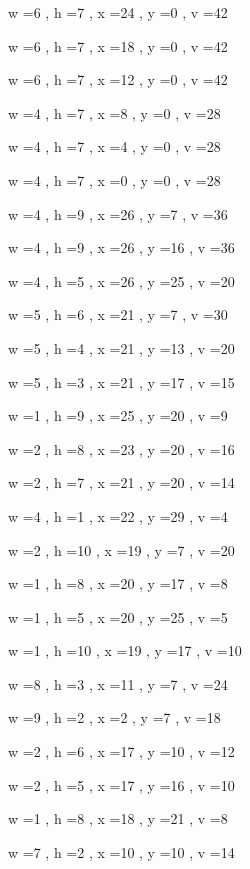 \documentclass[11pt]{article}
\begin{document}


w =6 , h =7 , x =24 , y =0 , v =42
\par
w =6 , h =7 , x =18 , y =0 , v =42
\par
w =6 , h =7 , x =12 , y =0 , v =42
\par
w =4 , h =7 , x =8 , y =0 , v =28
\par
w =4 , h =7 , x =4 , y =0 , v =28
\par
w =4 , h =7 , x =0 , y =0 , v =28
\par
w =4 , h =9 , x =26 , y =7 , v =36
\par
w =4 , h =9 , x =26 , y =16 , v =36
\par
w =4 , h =5 , x =26 , y =25 , v =20
\par
w =5 , h =6 , x =21 , y =7 , v =30
\par
w =5 , h =4 , x =21 , y =13 , v =20
\par
w =5 , h =3 , x =21 , y =17 , v =15
\par
w =1 , h =9 , x =25 , y =20 , v =9
\par
w =2 , h =8 , x =23 , y =20 , v =16
\par
w =2 , h =7 , x =21 , y =20 , v =14
\par
w =4 , h =1 , x =22 , y =29 , v =4
\par
w =2 , h =10 , x =19 , y =7 , v =20
\par
w =1 , h =8 , x =20 , y =17 , v =8
\par
w =1 , h =5 , x =20 , y =25 , v =5
\par
w =1 , h =10 , x =19 , y =17 , v =10
\par
w =8 , h =3 , x =11 , y =7 , v =24
\par
w =9 , h =2 , x =2 , y =7 , v =18
\par
w =2 , h =6 , x =17 , y =10 , v =12
\par
w =2 , h =5 , x =17 , y =16 , v =10
\par
w =1 , h =8 , x =18 , y =21 , v =8
\par
w =7 , h =2 , x =10 , y =10 , v =14
\par
\newpage
\end{document}
